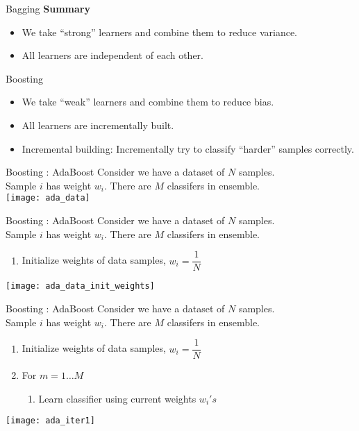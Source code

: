 \documentclass{beamer}
\begin{document}
\begin{frame}{Bagging}
  \textbf{Summary}
  \begin{itemize}
    \item We take ``strong'' learners and combine them to reduce variance.
    \item All learners are independent of each other.
  \end{itemize}
\end{frame}

\begin{frame}{Boosting}
  \begin{itemize}
    \item We take ``weak'' learners and combine them to reduce bias.
          \pause \item All learners are incrementally built.
          \pause \item Incremental building: Incrementally try to classify ``harder'' samples correctly.
  \end{itemize}
\end{frame}

\begin{frame}{Boosting : AdaBoost }
  Consider we have a dataset of $N$ samples.\\
  Sample $i$ has weight $w_i$. There are $M$ classifers in ensemble.\\
  \vspace{0.5cm}
  \centering
  \texttt{[image: ada\_data]}
\end{frame}

\begin{frame}{Boosting : AdaBoost }
  Consider we have a dataset of $N$ samples.\\
  Sample $i$ has weight $w_i$. There are $M$ classifers in ensemble.\\
  \begin{enumerate}
    \item Initialize weights of data samples, $w_i = \dfrac{1}{N}$
  \end{enumerate}
  \vspace{0.5cm}
  \centering
  \texttt{[image: ada\_data\_init\_weights]}
\end{frame}

\begin{frame}{Boosting : AdaBoost }
  Consider we have a dataset of $N$ samples.\\
  Sample $i$ has weight $w_i$. There are $M$ classifers in ensemble.\\
  \begin{enumerate}
    \item Initialize weights of data samples, $w_i = \dfrac{1}{N}$
    \item For $m = 1\dots M$
          \begin{enumerate}
            \item Learn classifier using current weights $w_i's$
          \end{enumerate}
  \end{enumerate}
  \centering
  \texttt{[image: ada\_iter1]}
\end{frame}
\end{document}
